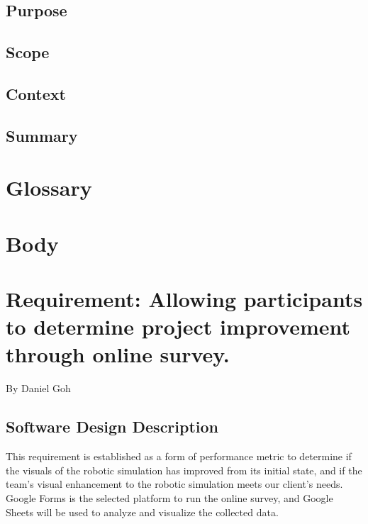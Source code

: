 \documentclass[10pt,journal,compsoc,draftclsnofoot]{IEEEtran}
\begin{document}
\begin{flushleft}

\subsection{Purpose}

\subsection{Scope}

\subsection{Context}

\subsection{Summary}

\newpage




\section{Glossary}

\newpage

\section{Body}



\newpage
\section{Requirement: Allowing participants to determine project improvement through online survey.}
\large{By Daniel Goh}

\normalsize
\subsection{Software Design Description}
This requirement is established as a form of performance metric to determine if the visuals of the robotic simulation has improved from its initial state, and if the team’s visual enhancement to the robotic simulation meets our client’s needs. 
Google Forms is the selected platform to run the online survey, and Google Sheets will be used to analyze and visualize the collected data.


\end{flushleft}
\end{document}
